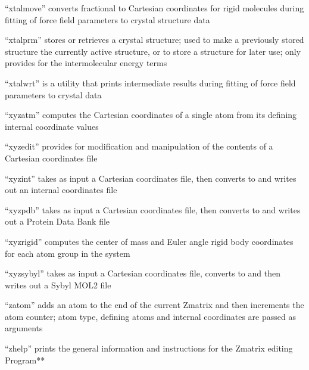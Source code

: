 \documentclass[letterpaper,11pt,english]{sphinxmanual}
\begin{document}

“xtalmove” converts fractional to Cartesian coordinates for rigid molecules during fitting of force field parameters to crystal structure data


“xtalprm” stores or retrieves a crystal structure; used to make a previously stored structure the currently active structure, or to store a structure for later use; only provides for the intermolecular energy terms


“xtalwrt” is a utility that prints intermediate results during fitting of force field parameters to crystal data


“xyzatm” computes the Cartesian coordinates of a single atom from its defining internal coordinate values


“xyzedit” provides for modification and manipulation of the contents of a Cartesian coordinates file


“xyzint” takes as input a Cartesian coordinates file, then converts to and writes out an internal coordinates file


“xyzpdb” takes as input a Cartesian coordinates file, then converts to and writes out a Protein Data Bank file


“xyzrigid” computes the center of mass and Euler angle rigid body coordinates for each atom group in the system


“xyzsybyl” takes as input a Cartesian coordinates file, converts to and then writes out a Sybyl MOL2 file


“zatom” adds an atom to the end of the current Z\sphinxhyphen{}matrix and then increments the atom counter; atom type, defining atoms and internal coordinates are passed as arguments


“zhelp” prints the general information and instructions for the Z\sphinxhyphen{}matrix editing Program**
\end{document}
